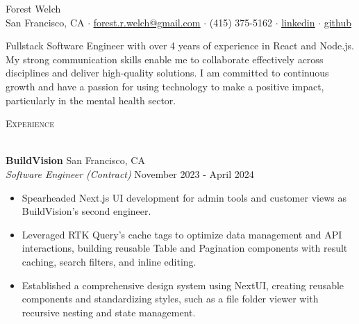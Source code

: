 \documentclass[a4paper]{article}
\newcommand{\header} [1] {
    {\hspace*{-18pt}\vspace*{3pt} \textcolor{deeppurple}{\textsc{#1}}}
    \vspace*{-12pt} \\
    \hspace*{-18pt} \textcolor{deeppurple}{\hrulefill} \\
}
\begin{document}
\vspace{-40pt}

\begin{center}
    {\fontsize{36}{36}\selectfont \textcolor{deeppurple}{Forest Welch}} \\ %
    \vspace{10pt} %
    \small San Francisco, CA $\cdot$ \href{mailto:forest.r.welch@gmail.com}{\underline{forest.r.welch@gmail.com}} $\cdot$ (415) 375-5162 $\cdot$ \href{https://linkedin.com/in/forestrwelch}{\underline{linkedin}} $\cdot$ \href{https://github.com/nwelchr}{\underline{github}}
\end{center}

\vspace{10pt}

Fullstack Software Engineer with over 4 years of experience in React and Node.js. My strong communication skills enable me to collaborate effectively across disciplines and deliver high-quality solutions. I am committed to continuous growth and have a passion for using technology to make a positive impact, particularly in the mental health sector.

\vspace{10pt}

\header{Experience}
\vspace{1mm}

\textbf{BuildVision} \hfill San Francisco, CA\\
\textit{Software Engineer (Contract)} \hfill November 2023 - April 2024\\
\vspace{-1mm}
\begin{itemize} \itemsep .5pt
    \item Spearheaded Next.js UI development for admin tools and customer views as BuildVision's second engineer.
    \item Leveraged RTK Query's cache tags to optimize data management and API interactions, building reusable Table and Pagination components with result caching, search filters, and inline editing.
    \item Established a comprehensive design system using NextUI, creating reusable components and standardizing styles, such as a file folder viewer with recursive nesting and state management.
\end{itemize}
\end{document}
